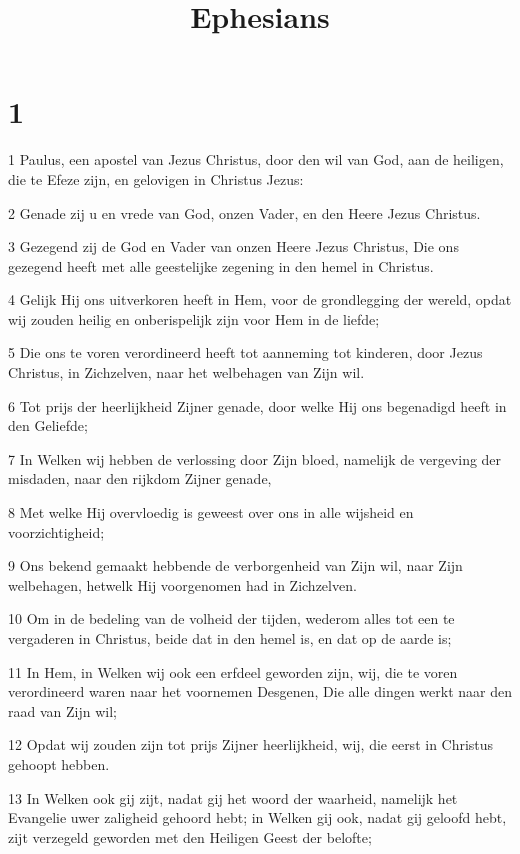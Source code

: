 

\title{Ephesians}



\chapter{1}

\par 1 Paulus, een apostel van Jezus Christus, door den wil van God, aan de heiligen, die te Efeze zijn, en gelovigen in Christus Jezus:
\par 2 Genade zij u en vrede van God, onzen Vader, en den Heere Jezus Christus.
\par 3 Gezegend zij de God en Vader van onzen Heere Jezus Christus, Die ons gezegend heeft met alle geestelijke zegening in den hemel in Christus.
\par 4 Gelijk Hij ons uitverkoren heeft in Hem, voor de grondlegging der wereld, opdat wij zouden heilig en onberispelijk zijn voor Hem in de liefde;
\par 5 Die ons te voren verordineerd heeft tot aanneming tot kinderen, door Jezus Christus, in Zichzelven, naar het welbehagen van Zijn wil.
\par 6 Tot prijs der heerlijkheid Zijner genade, door welke Hij ons begenadigd heeft in den Geliefde;
\par 7 In Welken wij hebben de verlossing door Zijn bloed, namelijk de vergeving der misdaden, naar den rijkdom Zijner genade,
\par 8 Met welke Hij overvloedig is geweest over ons in alle wijsheid en voorzichtigheid;
\par 9 Ons bekend gemaakt hebbende de verborgenheid van Zijn wil, naar Zijn welbehagen, hetwelk Hij voorgenomen had in Zichzelven.
\par 10 Om in de bedeling van de volheid der tijden, wederom alles tot een te vergaderen in Christus, beide dat in den hemel is, en dat op de aarde is;
\par 11 In Hem, in Welken wij ook een erfdeel geworden zijn, wij, die te voren verordineerd waren naar het voornemen Desgenen, Die alle dingen werkt naar den raad van Zijn wil;
\par 12 Opdat wij zouden zijn tot prijs Zijner heerlijkheid, wij, die eerst in Christus gehoopt hebben.
\par 13 In Welken ook gij zijt, nadat gij het woord der waarheid, namelijk het Evangelie uwer zaligheid gehoord hebt; in Welken gij ook, nadat gij geloofd hebt, zijt verzegeld geworden met den Heiligen Geest der belofte;
